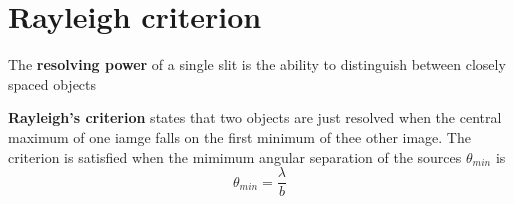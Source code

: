 \documentclass[a4paper, 10pt]{article}
\begin{document}
\section{Rayleigh criterion}
\begin{framed}
   The \textbf{resolving power} of a single slit is the ability to distinguish between closely spaced objects
\end{framed}	
\begin{framed}
   \textbf{Rayleigh's criterion} states that two objects are just resolved when the central maximum of one iamge falls on the first minimum of thee other image. The criterion is satisfied when the mimimum angular separation of the sources $\theta_{min}$ is
   \[
      \theta_{min} = \frac{\lambda}{b}
   \]
   
\end{framed}	
\end{document}
